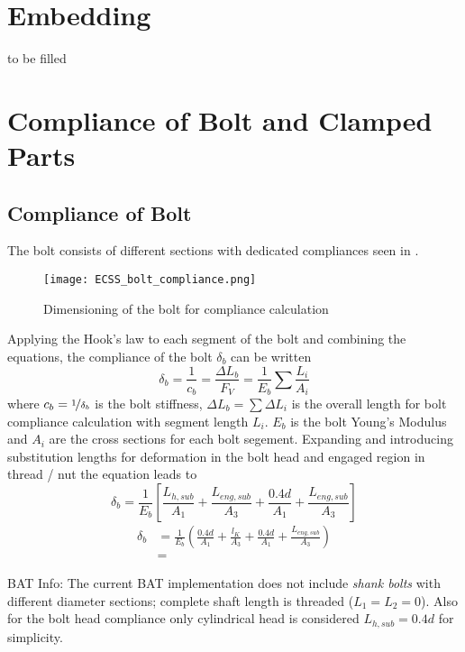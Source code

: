 \section{Embedding}
\label{sec:embedding}
to be filled

\section{Compliance of Bolt and Clamped Parts}
\subsection{Compliance of Bolt}
The bolt consists of different sections with dedicated compliances seen in .
\begin{figure}[!htpb]
  \centering
  \texttt{[image: ECSS\_bolt\_compliance.png]}
  \caption{Dimensioning of the bolt for compliance calculation \cite{ECSS_HB_32_23A}}
  \label{fig:ECSS_bolt_compliance}
\end{figure}

Applying the Hook's law to each segment of the bolt and combining the equations, the compliance of the 
bolt $\delta_b$ can be written
\begin{equation}
  \delta_b = \frac{1}{c_b}=\frac{\Delta L_b}{F_V}=\frac{1}{E_b}\sum\frac{L_i}{A_i}
  \label{equ:delta_b_1}
\end{equation}
where $c_b=\nicefrac{1}{\delta_b}$ is the bolt stiffness, $\Delta L_b=\sum \Delta L_i$ is the overall
length for bolt compliance calculation with segment length $L_i$. $E_b$ is the bolt Young's Modulus and 
$A_i$ are the cross sections for each bolt segement. Expanding  and introducing 
substitution lengths for deformation in the bolt head and engaged region in thread / nut the equation
leads to
\begin{equation}
  \delta_b = \frac{1}{E_b}\left[\frac{L_{h,sub}}{A_1}+\frac{L_{eng,sub}}{A_3}+\frac{0.4d}{A_1}
    +\frac{L_{eng,sub}}{A_3}\right]
\end{equation}
\begin{subequations}
  \begin{align}
    \delta_b &= \frac{1}{E_b}\left(\frac{0.4d}{A_1}+\frac{l_K}{A_3}+\frac{0.4d}{A_1}
      +\frac{L_{eng,sub}}{A_3}\right) \\
      &=
  \end{align}
\end{subequations}
\begin{colbox}{BAT Info:}
  The current BAT implementation does not include \emph{shank bolts} with different diameter sections; 
  complete shaft length is threaded ($L_1=L_2=0$). Also for the bolt head compliance only cylindrical
  head is considered $L_{h,sub}=0.4d$ for simplicity. 
\end{colbox}


